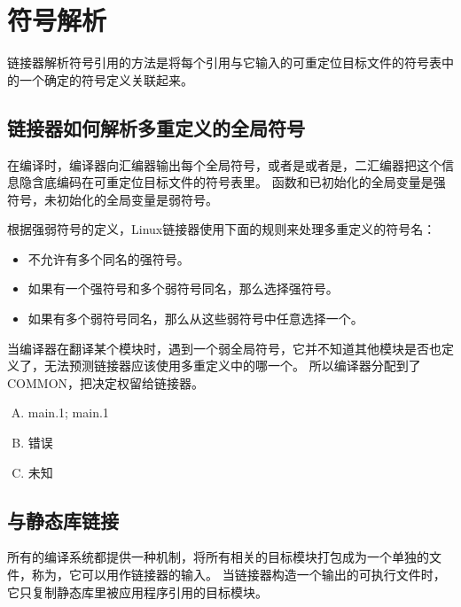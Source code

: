 
\section{符号解析}
{
    链接器解析符号引用的方法是将每个引用与它输入的可重定位目标文件的符号表中的一个确定的符号定义关联起来。

    \subsection{链接器如何解析多重定义的全局符号}
    {
        在编译时，编译器向汇编器输出每个全局符号，或者是或者是，二汇编器把这个信息隐含底编码在可重定位目标文件的符号表里。
        函数和已初始化的全局变量是强符号，未初始化的全局变量是弱符号。

        根据强弱符号的定义，Linux链接器使用下面的规则来处理多重定义的符号名：

        \begin{itemize}
            \item 不允许有多个同名的强符号。
            \item 如果有一个强符号和多个弱符号同名，那么选择强符号。
            \item 如果有多个弱符号同名，那么从这些弱符号中任意选择一个。
        \end{itemize}

        当编译器在翻译某个模块时，遇到一个弱全局符号，它并不知道其他模块是否也定义了，无法预测链接器应该使用多重定义中的哪一个。
        所以编译器分配到了COMMON，把决定权留给链接器。

        \begin{practicec}
            \begin{enumerate}[A.]
                \item main.1; main.1
                \item 错误
                \item 未知
            \end{enumerate}
        \end{practicec}
    }

    \subsection{与静态库链接}
    {
        所有的编译系统都提供一种机制，将所有相关的目标模块打包成为一个单独的文件，称为，它可以用作链接器的输入。
        当链接器构造一个输出的可执行文件时，它只复制静态库里被应用程序引用的目标模块。
    }
}

